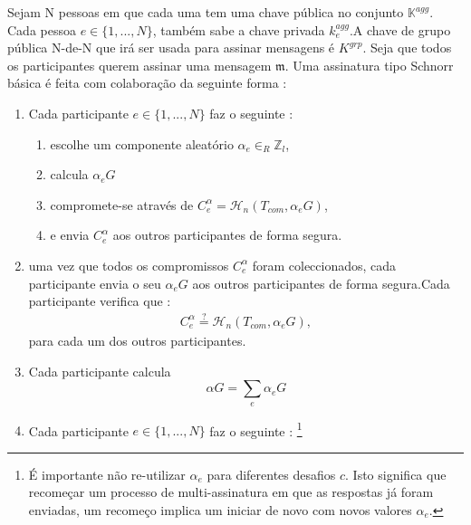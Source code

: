 Sejam N pessoas em que cada uma tem uma chave pública no conjunto $\mathbb{K}^{agg}$. Cada pessoa $e \in \{1,...,N\}$, também sabe a chave privada $k^{agg}_e$.\newline A chave de grupo pública N-de-N que irá ser usada para assinar mensagens é $K^{grp}$. \newline Seja que todos os participantes querem assinar uma mensagem $\mathfrak{m}$. Uma assinatura tipo Schnorr básica é feita com colaboração da seguinte forma : 
\begin{enumerate}
    \item Cada participante $e \in \{1,...,N\}$ faz o seguinte :
    \begin{enumerate}
        \item escolhe um componente aleatório $\alpha_e \in_R \mathbb{Z}_l$,
        \item calcula $\alpha_e G$
        \item compromete-se através de $C^{\alpha}_e = \mathcal{H}_n(T_{com},\alpha_e G)$,
        \item e envia $C^{\alpha}_e$ aos outros participantes de forma segura.
    \end{enumerate}
    \item uma vez que todos os compromissos $C^{\alpha}_e$ foram coleccionados, cada participante envia o seu $\alpha_e G$ aos outros participantes de forma segura.\newline Cada participante verifica que :
\begin{align*} 
C^{\alpha}_e \stackrel{?}{=} \mathcal{H}_n(T_{com},\alpha_e G) ,
\end{align*}
para cada um dos outros participantes.
    \item Cada participante calcula 
    \[ \alpha G = \sum_e \alpha_e G \]
    \item Cada participante $e \in \{1,...,N\}$ faz o seguinte :
\footnote{É importante não re-utilizar $\alpha_e$ para diferentes desafios $c$. Isto significa que recomeçar um processo de multi-assinatura em que as respostas já foram enviadas, um recomeço implica um iniciar de novo com novos valores $\alpha_e$.}

\end{enumerate}
